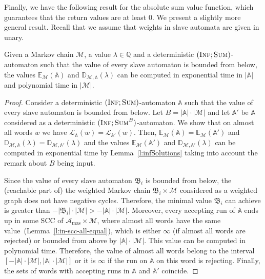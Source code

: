 \documentclass{lmcs}
\newcommand{\masterA}{\mathcal{A}_{\textrm{mas}}}
\newcommand{\nestedA}{\mathbb{A}}
\newcommand{\slaveA}{{\mathfrak{B}}}
\newcommand{\valueL}[1]{\mathcal{L}_{{#1}}}
\newcommand{\Q}{\mathbb{Q}}
\newcommand{\fsum}{\textsc{Sum}}
\newcommand{\fBsum}[1]{\textsc{Sum}^{#1}}
\newcommand{\finf}{\textsc{Inf}}
\newcommand{\const}{\lambda}
\newcommand{\expected}{\mathbb{E}}
\newcommand{\distrib}{\mathbb{D}}
\newcommand{\markov}{\mathcal{M}}
\begin{document}
Finally, we have the following result for the absolute sum value function, which guarantees that the return values are at least $0$. We present a slightly more general result.
Recall that we assume that weights in slave automata are given in unary.

\begin{lem}\label{l:bound-from-below}
Given a Markov chain $\markov$, a value $\const \in \Q$ and a deterministic $(\finf;\fsum)$-automaton
such that the value of every slave automaton is bounded from below,
the values $\expected_{\markov}(\nestedA)$ and $\distrib_{\markov,\nestedA}(\const)$ can be computed in exponential time in $|\nestedA|$ and polynomial time in $|\markov|$.
\end{lem}



\begin{proof}
Consider a deterministic $(\finf;\fsum)$-automaton $\nestedA$ such that the value of every slave automaton is bounded from below.
Let $B = |\nestedA|\cdot |\markov|$ and let $\nestedA'$ be $\nestedA$ considered as a deterministic $(\finf; \fBsum{B})$-automaton.
We show that on almost all words $w$ we have $\valueL{\nestedA}(w) = \valueL{\nestedA'}(w)$.
Then,
$\expected_{\markov}(\nestedA) = \expected_{\markov}(\nestedA')$
and $\distrib_{\markov,\nestedA}(\const) = \distrib_{\markov,\nestedA'}(\const)$ and the values
$\expected_{\markov}(\nestedA')$ and $\distrib_{\markov,\nestedA'}(\const)$ can be computed in exponential time by
Lemma~\ref{l:infSolutions} taking into account the remark about $B$ being input.

Since the value of every slave automaton $\slaveA_i$ is bounded from below,
the (reachable part of) the weighted Markov chain $\slaveA_i \times \markov$ considered as a weighted graph does not have negative cycles.
Therefore, the minimal value $\slaveA_i$ can achieve is greater than $-|\slaveA_i|\cdot|\markov| > - |\nestedA|\cdot|\markov|$.
Moreover, every accepting run of $\nestedA$ ends up in some SCC of $\masterA \times \markov$, where
almost all words have the same value~(Lemma~\ref{l:in-scc-all-equal}), which
is either $\infty$ (if almost all words are rejected) or bounded from above by $|\nestedA|\cdot|\markov|$. This value can be computed in polynomial time.
Therefore, the value of almost all words belong to the interval $[- |\nestedA|\cdot|\markov|,  |\nestedA|\cdot|\markov|]$ or it is $\infty$ if the run on $\nestedA$ on this word is rejecting.
Finally, the sets of words with accepting runs in $\nestedA$ and $\nestedA'$ coincide.
\end{proof}
\end{document}

